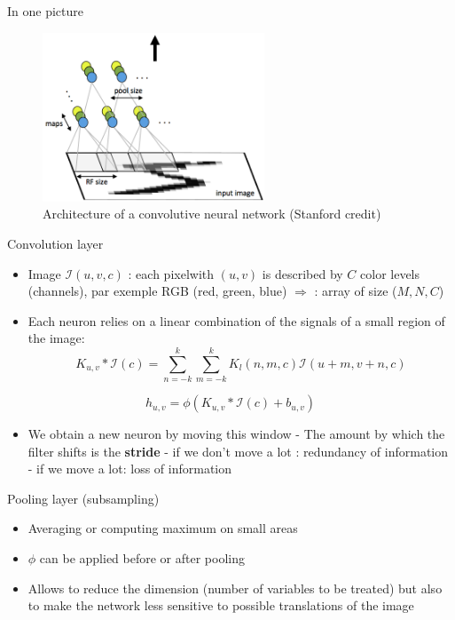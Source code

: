 \documentclass[ignorenonframetext,]{beamer}
\providecommand{\tightlist}{%
  \setlength{\itemsep}{0pt}\setlength{\parskip}{0pt}}
\begin{document}
\begin{frame}{In one picture}
\protect\hypertarget{in-one-picture}{}

\begin{figure}
\centering
\includegraphics[width=2.60417in,height=\textheight]{Cnn_layer_standford.png}
\caption{Architecture of a convolutive neural network (Stanford credit)}
\end{figure}

\end{frame}

\begin{frame}{Convolution layer}
\protect\hypertarget{convolution-layer}{}

\begin{itemize}
\item
  Image \(\mathcal{I}(u,v,c)\) : each pixelwith \((u,v)\) is described
  by \(C\) color levels (channels), par exemple RGB (red, green, blue)
  \(\Rightarrow\) : array of size (\(M,N,C\))
\item
  Each neuron relies on a linear combination of the signals of a small
  region of the image:
  \[K_{u,v}*\mathcal{I}(c) =  \sum_{n=-k}^{k}\sum_{m=-k}^k K_l(n,m,c)\mathcal{I}\left(u+m,v+n,c \right)\]
\end{itemize}

\[h_{u,v} = \phi(K_{u,v}*\mathcal{I}(c)+b_{u,v})\]

\begin{itemize}
\tightlist
\item
  We obtain a new neuron by moving this window - The amount by which the
  filter shifts is the \textbf{stride} - if we don't move a lot :
  redundancy of information - if we move a lot: loss of information
\end{itemize}

\end{frame}

\begin{frame}{Pooling layer (subsampling)}
\protect\hypertarget{pooling-layer-subsampling}{}

\begin{itemize}
\tightlist
\item
  Averaging or computing maximum on small areas
\item
  \(\phi\) can be applied before or after pooling
\item
  Allows to reduce the dimension (number of variables to be treated) but
  also to make the network less sensitive to possible translations of
  the image
\end{itemize}

\end{frame}
\end{document}
